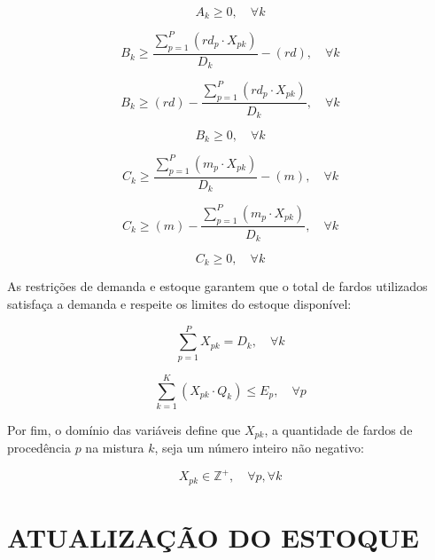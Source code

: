 \documentclass[
    12pt,                %
    openright,           %
    oneside,             %
    a4paper,             %
    english,             %
    spanish,             %
    brazil               %
]{ufscar}
\begin{document}
\begin{equation}
A_k \geq 0, \quad \forall k
\end{equation}

\begin{equation}
B_k \geq \frac{\sum_{p=1}^{P} (rd_p \cdot X_{pk})}{D_k} - (rd), \quad \forall k
\end{equation}

\begin{equation}
B_k \geq (rd) - \frac{\sum_{p=1}^{P} (rd_p \cdot X_{pk})}{D_k}, \quad \forall k
\end{equation}

\begin{equation}
B_k \geq 0, \quad \forall k
\end{equation}

\begin{equation}
C_k \geq \frac{\sum_{p=1}^{P} (m_p \cdot X_{pk})}{D_k} - (m), \quad \forall k
\end{equation}

\begin{equation}
C_k \geq (m) - \frac{\sum_{p=1}^{P} (m_p \cdot X_{pk})}{D_k}, \quad \forall k
\end{equation}

\begin{equation}
C_k \geq 0, \quad \forall k
\end{equation}

As restrições de demanda e estoque garantem que o total de fardos utilizados satisfaça a demanda e respeite os limites do estoque disponível:

\begin{equation}
\sum_{p=1}^{P} X_{pk} = D_k, \quad \forall k
\end{equation}

\begin{equation}
\sum_{k=1}^{K} (X_{pk} \cdot Q_k) \leq E_p, \quad \forall p
\end{equation}

Por fim, o domínio das variáveis define que $X_{pk}$, a quantidade de fardos de procedência $p$ na mistura $k$, seja um número inteiro não negativo:

\begin{equation}
X_{pk} \in \mathbb{Z}^+, \quad \forall p, \forall k
\end{equation}

\section{ATUALIZAÇÃO DO ESTOQUE}
\end{document}
